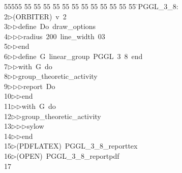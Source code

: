 %
%
\begin{tabbing}
55555 \= 55 \= 55 \= 55 \= 55 \= 55 \= 55 \= 55 \= 55 \= 55 \= 55 \= 55 \= 55 \= \>PGGL\_3\_8:\\[0pt]
2\>$\triangleright$\>(ORBITER)\ v\ 2\ \\[0pt]
3\>$\triangleright$\>$\triangleright$\>define\ Do\ draw\_options\ \\[0pt]
4\>$\triangleright$\>$\triangleright$\>$\triangleright$\>radius\ 200\ line\_width\ 03\ \\[0pt]
5\>$\triangleright$\>$\triangleright$\>end\ \\[0pt]
6\>$\triangleright$\>$\triangleright$\>define\ G\ linear\_group\ PGGL\ 3\ 8\ end\ \\[0pt]
7\>$\triangleright$\>$\triangleright$\>with\ G\ do\ \\[0pt]
8\>$\triangleright$\>$\triangleright$\>group\_theoretic\_activity\ \\[0pt]
9\>$\triangleright$\>$\triangleright$\>$\triangleright$\>report\ Do\ \\[0pt]
10\>$\triangleright$\>$\triangleright$\>end\ \\[0pt]
11\>$\triangleright$\>$\triangleright$\>with\ G\ do\ \\[0pt]
12\>$\triangleright$\>$\triangleright$\>group\_theoretic\_activity\ \\[0pt]
13\>$\triangleright$\>$\triangleright$\>$\triangleright$\>sylow\ \\[0pt]
14\>$\triangleright$\>$\triangleright$\>end\\[0pt]
15\>$\triangleright$\>(PDFLATEX)\ PGGL\_3\_8\_reporttex\\[0pt]
16\>$\triangleright$\>(OPEN)\ PGGL\_3\_8\_reportpdf\\[0pt]
17\>\end{tabbing}
